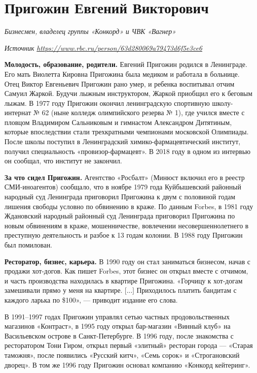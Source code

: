 \newpage
\section[Евгений Пригожин]{Пригожин Евгений Викторович}

\textit{Бизнесмен, владелец группы «Конкорд» и ЧВК «Вагнер»}

\textit{Источник \url{https://www.rbc.ru/person/63d280069a79473d6f5e3ce6}}

\textbf{Молодость, образование, родители.} Евгений Пригожин родился в Ленинграде. Его мать Виолетта Кировна Пригожина была медиком и работала в больнице. Отец Виктор Евгеньевич Пригожин рано умер, и ребенка воспитывал отчим Самуил Жаркой. Будучи лыжным инструктором, Жаркой приобщил его к беговым лыжам. В 1977 году Пригожин окончил ленинградскую спортивную школу-интернат № 62 (ныне колледж олимпийского резерва № 1), где учился вместе с пловцом Владимиром Сальниковым и гимнастом Александром Дитятиным, которые впоследствии стали трехкратными чемпионами московской Олимпиады. После школы поступил в Ленинградский химико-фармацевтический институт, получил специальность «провизор-фармацевт». В 2018 году в одном из интервью он сообщал, что институт не закончил.

\textbf{За что сидел Пригожин.} Агентство «Росбалт» (Минюст включил его в реестр СМИ-иноагентов) сообщало, что в ноябре 1979 года Куйбышевский районный народный суд Ленинграда приговорил Пригожина к двум с половиной годам лишения свободы условно по обвинению в краже. По данным Forbes, в 1981 году Ждановский народный районный суд Ленинграда приговорил Пригожина по новым обвинениям в краже, мошенничестве, вовлечении несовершеннолетнего в преступную деятельность и разбое к 13 годам колонии. В 1988 году Пригожин был помилован.

\textbf{Ресторатор, бизнес, карьера.} В 1990 году он стал заниматься бизнесом, начав с продажи хот-догов. Как пишет Forbes, этот бизнес он открыл вместе с отчимом, и часть производства находилась в квартире Пригожина. «Горчицу к хот-догам замешивали прямо у меня на квартире. [...] Приходилось платить бандитам с каждого ларька по \$100», — приводит издание его слова.

В 1991–1997 годах Пригожин управлял сетью частных продовольственных магазинов «Контраст», в 1995 году открыл бар-магазин «Винный клуб» на Васильевском острове в Санкт-Петербурге. В 1996 году, после знакомства с ресторатором Тони Гиром, открыл первый «элитный» ресторан города — «Старая таможня», после появились «Русский китч», «Семь сорок» и «Строгановский дворец».
В том же 1996 году Пригожин основал компанию «Конкорд кейтеринг».

